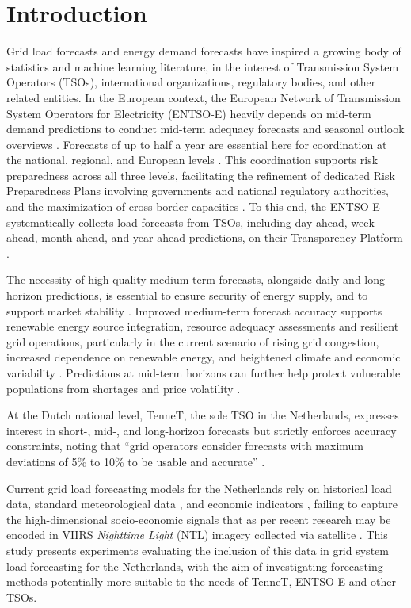 \section{Introduction}
\label{sec:introduction}

Grid load forecasts and energy demand forecasts have inspired a growing body of statistics and machine learning literature, in the interest of Transmission System Operators (TSOs), international organizations, regulatory bodies, and other related entities. In the European context, the European Network of Transmission System Operators for Electricity (ENTSO-E) heavily depends on mid-term demand predictions to conduct mid-term adequacy forecasts \cite{midterm_adequacy} and seasonal outlook overviews \cite{nseasonal}. Forecasts of up to half a year are essential here for coordination at the national, regional, and European levels \cite{entsoe_mop}. This coordination supports risk preparedness across all three levels, facilitating the refinement of dedicated Risk Preparedness Plans involving governments and national regulatory authorities, and the maximization of cross-border capacities \cite{entsoe_mop}. To this end, the ENTSO-E systematically collects load forecasts from TSOs, including day-ahead, week-ahead, month-ahead, and year-ahead predictions, on their Transparency Platform \cite{entsoe_mop}. 

The necessity of high-quality medium-term forecasts, alongside daily and long-horizon predictions, is essential to ensure security of energy supply, and to support market stability \cite{curiel_integrating_2025}. Improved medium-term forecast accuracy supports renewable energy source integration, resource adequacy assessments and resilient grid operations, particularly in the current scenario of rising grid congestion, increased dependence on renewable energy, and heightened climate and economic variability \cite{curiel_integrating_2025}. Predictions at mid-term horizons can further help protect vulnerable populations from shortages and price volatility \cite{van_de_sande_enhancing_2024}.

At the Dutch national level, TenneT, the sole TSO in the Netherlands, expresses interest in short-, mid-, and long-horizon forecasts but strictly enforces accuracy constraints, noting that ``grid operators consider forecasts with maximum deviations of 5\% to 10\% to be usable and accurate'' \cite{tennet_forecasts}.

Current grid load forecasting models for the Netherlands rely on historical load data, standard meteorological data \cite{curiel_integrating_2025,van_de_sande_enhancing_2024,ashtar_hybrid_2025}, and economic indicators \cite{curiel_integrating_2025,van_de_sande_enhancing_2024,ashtar_hybrid_2025}, failing to capture the high-dimensional socio-economic signals that as per recent research \cite{chen_monthly_2025,r_forecasting_2025,borunda_machine_2025} may be encoded in VIIRS \textit{Nighttime Light} (NTL) imagery collected via satellite \cite{nasa_viirs_vnp46a2}. This study presents experiments evaluating the inclusion of this data in grid system load forecasting for the Netherlands, with the aim of investigating forecasting methods potentially more suitable to the needs of TenneT, ENTSO-E and other TSOs.

